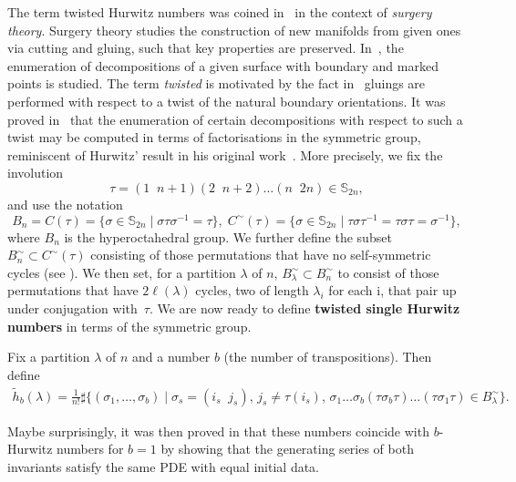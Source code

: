 The term twisted Hurwitz numbers was coined in~\cite{BF21} in the context of \textit{surgery theory}. Surgery theory studies the construction of new manifolds from given ones via cutting and gluing, such that key properties are preserved. In~\cite{BF21}, the enumeration of decompositions of a given surface with boundary and marked points is studied. The term \textit{twisted} is motivated by the fact in~\cite{BF21} gluings are performed with respect to a twist of the natural boundary orientations. It was proved in~\cite{BF21} that the enumeration of certain decompositions with respect to such a twist may be computed in terms of factorisations in the symmetric group, reminiscent of Hurwitz' result in his original work~\cite{hurwitz1892algebraische}. More precisely, we fix the involution $$\tau= (1\;\; n+1) (2 \;\;n+2) \ldots (n \;\;2n)\in \mathbb{S}_{2n},$$ and use the notation
\begin{equation*}
    B_n=C(\tau)=\{\sigma \in \mathbb{S}_{2n} \mid  \sigma \tau \sigma^{-1}=\tau\}, \; C^\sim(\tau)=\{\sigma \in \mathbb{S}_{2n} \mid  \tau \sigma \tau^{-1} = \tau \sigma \tau =  \sigma^{-1}\},
\end{equation*}
where $B_n$ is the hyperoctahedral group. We further define the subset $B^\sim_n \subset C^\sim(\tau)$ consisting of those permutations that have no self-symmetric cycles (see \cite[Lemma~2.1]{BF21}). We then set, for a partition $\lambda$ of $n$,  $B^\sim_\lambda\subset B^\sim_n$ to consist of those permutations that have $2\ell(\lambda)$ cycles, two of length $\lambda_i$ for each i, that pair up under conjugation with~$\tau$. We are now ready to define \textbf{twisted single Hurwitz numbers} in terms of the symmetric group.

\begin{defi}
\label{def:twisthur}
Fix a partition $\lambda$ of $n$ and a number $b$ (the number of transpositions).
Then define
\begin{align*}
\tilde{h}_{b}(\lambda)= \frac{1}{n!}\sharp \Big\{(\sigma_1,\ldots,\sigma_b) \mid  \sigma_s=(i_s\;\;j_s),\, j_s\neq \tau(i_s),\, \sigma_1\ldots\sigma_b (\tau\sigma_b\tau)\ldots (\tau\sigma_1\tau) \in B^{\sim}_\lambda\Big\}.
\end{align*}
\end{defi}

Maybe surprisingly, it was then proved in \cite[Theorem 3.2]{BF21} that these numbers coincide with $b$-Hurwitz numbers for $b=1$ by showing that the generating series of both invariants satisfy the same PDE with equal initial data.

